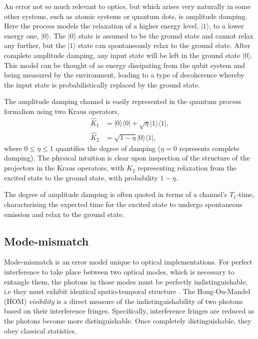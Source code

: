 \documentclass[aps,rmp,twocolumn,amsmath,amssymb,nofootinbib,superscriptaddress]{revtex4}
\newcommand{\bra}[1]{\langle#1|}
\newcommand{\ket}[1]{|#1\rangle}
\begin{document}
An error not so much relevant to optics, but which arises very naturally in some other systems, such as atomic systems or quantum dots, is amplitude damping. Here the process models the relaxation of a higher energy level, $\ket{1}$, to a lower energy one, $\ket{0}$. The $\ket{0}$ state is assumed to be the ground state and cannot relax any further, but the $\ket{1}$ state can spontaneously relax to the ground state. After complete amplitude damping, any input state will be left in the ground state $\ket{0}$. This model can be thought of as energy dissipating from the qubit system and being measured by the environment, leading to a type of decoherence whereby the input state is probabilistically replaced by the ground state.

The amplitude damping channel is easily represented in the quantum process formalism using two Kraus operators,
\begin{align}
\hat{K}_1 &= \ket{0}\bra{0} + \sqrt\eta\ket{1}\bra{1}, \nonumber \\
\hat{K}_2 &= \sqrt{1-\eta}\ket{0}\bra{1}, 
\end{align}
where \mbox{$0\leq\eta\leq 1$} quantifies the degree of damping (\mbox{$\eta=0$} represents complete damping). The physical intuition is clear upon inspection of the structure of the projectors in the Kraus operators, with $\hat{K}_2$ representing relaxation from the excited state to the ground state, with probability \mbox{$1-\eta$}.

The degree of amplitude damping is often quoted in terms of a channel's $T_1$-time, characterising the expected time for the excited state to undergo spontaneous emission and relax to the ground state.

%
%

\subsection{Mode-mismatch} \label{sec:MM_error}

Mode-mismatch is an error model unique to optical implementations. For perfect interference to take place between two optical modes, which is necessary to entangle them, the photons in those modes must be perfectly indistinguishable, i.e they must exhibit identical spatio-temporal structure \cite{bib:RohdeMauererSilberhorn07}. The Hong-Ou-Mandel (HOM) \cite{bib:HOM87} \emph{visibility} is a direct measure of the indistinguishability of two photons based on their interference fringes. Specifically, interference fringes are reduced as the photons become more distinguishable. Once completely distinguishable, they obey classical statistics.
\end{document}
